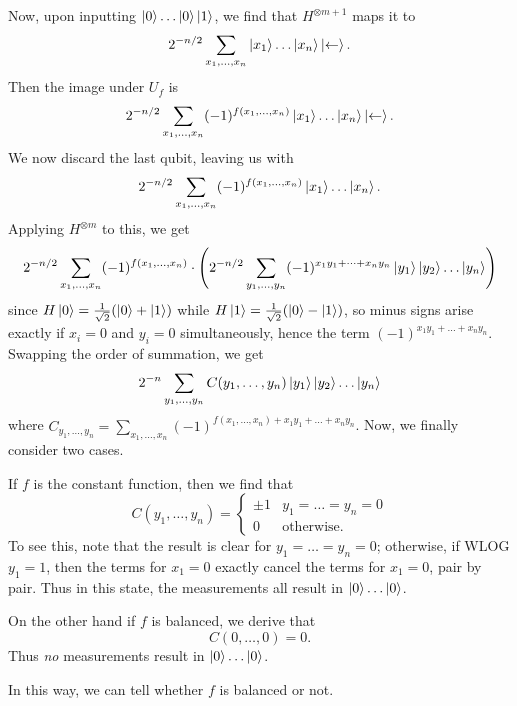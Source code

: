 \documentclass[11pt]{scrreprt}
\begin{document}
\begin{problem}
\begin{sol}
		Now, upon inputting $\ket0 \dots \ket0 \ket1$, we find that $H^{\otimes m+1}$ maps it to
		\[ 2^{-n/2} \sum_{x_1, \dots, x_n} \ket{x_1} \dots \ket{x_n} \ket\leftarrow.  \]
		Then the image under $U_f$ is
		\[ 2^{-n/2} \sum_{x_1, \dots, x_n} (-1)^{f(x_1, \dots, x_n)} \ket{x_1} \dots \ket{x_n} \ket\leftarrow.  \]
		We now discard the last qubit, leaving us with
		\[ 2^{-n/2} \sum_{x_1, \dots, x_n} (-1)^{f(x_1, \dots, x_n)} \ket{x_1} \dots \ket{x_n}.  \]
		Applying $H^{\otimes m}$ to this, we get
		\[ 2^{-n/2} \sum_{x_1, \dots, x_n} (-1)^{f(x_1, \dots, x_n)}
			\cdot
			\left(
			2^{-n/2}
			\sum_{y_1, \dots, y_n}
			(-1)^{x_1y_1 + \dots + x_ny_n}
			\ket{y_1} \ket{y_2} \dots \ket{y_n}
			\right)
		\]
		since $H\ket0 = \frac{1}{\sqrt2}(\ket0+\ket1)$
		while $H\ket1 = \frac{1}{\sqrt2}(\ket0-\ket1)$,
		so minus signs arise exactly if $x_i = 0$ and $y_i = 0$ simultaneously,
		hence the term $(-1)^{x_1y_1 + \dots + x_ny_n}$.
		Swapping the order of summation, we get
		\[ 
			2^{-n}
			\sum_{y_1, \dots, y_n}
			C(y_1, \dots, y_n)
			\ket{y_1} \ket{y_2} \dots \ket{y_n}
		\]
		where $C_{y_1, \dots, y_n}  = \sum_{x_1, \dots, x_n} (-1)^{f(x_1, \dots, x_n)+x_1y_1 + \dots + x_ny_n}$.
		Now, we finally consider two cases.
		\begin{itemize}
			\ii If $f$ is the constant function, then we find that
			\[
				C(y_1, \dots, y_n) = 
				\begin{cases}
					\pm 1 &  y_1 = \dots = y_n = 0 \\
					0 & \text{otherwise}.
				\end{cases}
			\]
			To see this, note that the result is clear for $y_1 = \dots = y_n = 0$;
			otherwise, if WLOG $y_1 = 1$, then the terms for $x_1 = 0$ exactly cancel
			the terms for $x_1 = 0$, pair by pair.
			Thus in this state, the measurements all result in $\ket0 \dots \ket0$.

			\ii On the other hand if $f$ is balanced, we derive that
			\[ C(0, \dots, 0) = 0. \]
			Thus \emph{no} measurements result in $\ket 0 \dots \ket 0$.
		\end{itemize}
		In this way, we can tell whether $f$ is balanced or not.
	\end{sol}
\end{problem}
\end{document}
